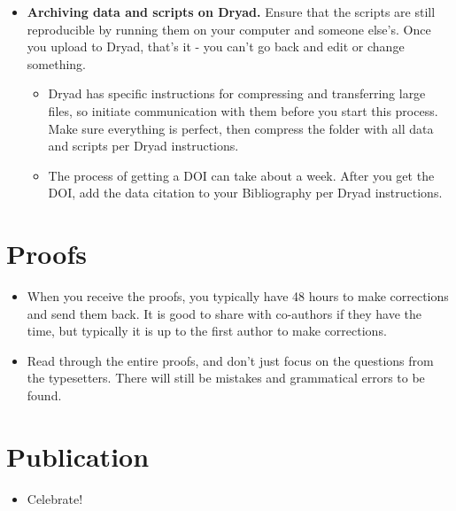 \documentclass[
  letterpaper,
  DIV=11,
  numbers=noendperiod]{scrreprt}
\providecommand{\tightlist}{%
  \setlength{\itemsep}{0pt}\setlength{\parskip}{0pt}}\usepackage{longtable,booktabs,array}
\begin{document}
\begin{itemize}
\item
  \textbf{Archiving data and scripts on Dryad.} Ensure that the scripts
  are still reproducible by running them on your computer and someone
  else's. Once you upload to Dryad, that's it - you can't go back and
  edit or change something.

  \begin{itemize}
  \item
    Dryad has specific instructions for compressing and transferring
    large files, so initiate communication with them before you start
    this process. Make sure everything is perfect, then compress the
    folder with all data and scripts per Dryad instructions.
  \item
    The process of getting a DOI can take about a week. After you get
    the DOI, add the data citation to your Bibliography per Dryad
    instructions.
  \end{itemize}
\end{itemize}

\hypertarget{proofs}{%
\section*{\texorpdfstring{\textbf{Proofs}}{Proofs}}\label{proofs}}


\begin{itemize}
\item
  When you receive the proofs, you typically have 48 hours to make
  corrections and send them back. It is good to share with co-authors if
  they have the time, but typically it is up to the first author to make
  corrections.
\item
  Read through the entire proofs, and don't just focus on the questions
  from the typesetters. There will still be mistakes and grammatical
  errors to be found.
\end{itemize}

\hypertarget{publication}{%
\section*{\texorpdfstring{\textbf{Publication}}{Publication}}\label{publication}}


\begin{itemize}
\tightlist
\item
  Celebrate!
\end{itemize}
\end{document}
